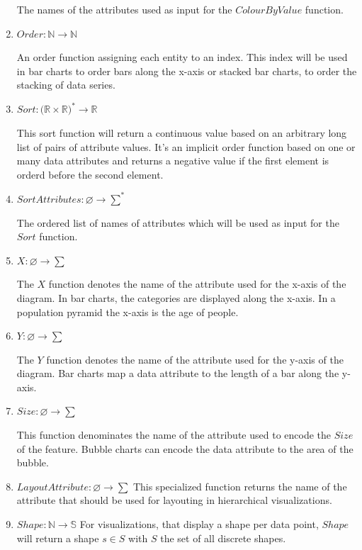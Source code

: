 \documentclass{article}
\begin{document}
\begin{enumerate}
        The names of the attributes used as input for the $ ColourByValue $ function.
    \item
        $ Order: \mathbb{N} \rightarrow \mathbb{N} $

        An order function assigning each entity to an index.
        This index will be used in bar charts to order bars along the x-axis or stacked bar charts, to order the stacking of data series.
    \item
        $ Sort: \big( \mathbb{R} \times \mathbb{R} \big)^* \rightarrow \mathbb{R} $

        This sort function will return a continuous value based on an arbitrary long list of pairs of attribute values.
        It's an implicit order function based on one or many data attributes and returns a negative value if the first element is orderd before the second element.
    \item
        $ SortAttributes: \varnothing \rightarrow \sum^* $

        The ordered list of names of attributes which will be used as input for the $Sort$ function.
    \item
        $ X: \varnothing \rightarrow \sum $

        The $X$ function denotes the name of the attribute used for the x-axis of the diagram.
        In bar charts, the categories are displayed along the x-axis.
        In a population pyramid the x-axis is the age of people.
    \item
        $ Y: \varnothing \rightarrow \sum $

        The $Y$ function denotes the name of the attribute used for the y-axis of the diagram.
        Bar charts map a data attribute to the length of a bar along the y-axis.
    \item
        $ Size: \varnothing \rightarrow \sum $

        This function denominates the name of the attribute used to encode the $ Size $ of the feature.
        Bubble charts can encode the data attribute to the area of the bubble.
    \item
        $ LayoutAttribute : \varnothing \rightarrow \sum $
        This specialized function returns the name of the attribute that should be used for layouting in hierarchical visualizations.
    \item
        $ Shape : \mathbb{N} \rightarrow \mathbb{S} $
        For visualizations, that display a shape per data point, $Shape$ will return a shape $ s \in S $ with $S$ the set of all discrete shapes.
\end{enumerate}
\end{document}
